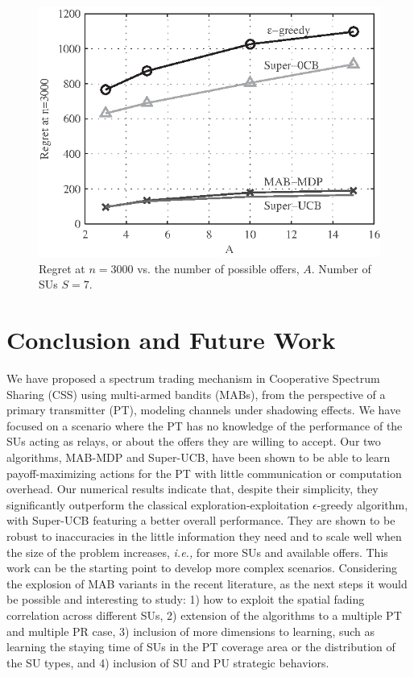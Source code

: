 \begin{figure}[!t]
\centering
\includegraphics{VsA.eps}
\caption{Regret at $n = 3000$ vs. the number of possible offers, $A$. Number of SUs $S = 7$.}
\label{fig:VsA}
\end{figure}

\section{Conclusion and Future Work}\label{sec:Con}
We have proposed a spectrum trading mechanism in Cooperative Spectrum Sharing (CSS) using multi-armed bandits (MABs), from the perspective of a primary transmitter (PT),  modeling channels under shadowing effects. 
We have focused on a scenario where the PT has no knowledge of the performance of the SUs acting as relays, or about the offers they are willing to accept. 
Our two algorithms, MAB-MDP and Super-UCB, have been shown to be able to learn payoff-maximizing actions for the PT with little communication or computation overhead. 
Our numerical results indicate that, despite their simplicity, they significantly outperform the classical exploration-exploitation $\epsilon$-greedy algorithm, with Super-UCB featuring a better overall performance.
They are shown to be robust to inaccuracies in the little information they need and to scale well when the size of the problem increases, \textit{i.e.,} for more SUs and available offers.
This work can be the starting point to develop more complex scenarios.  
Considering the explosion of MAB variants in the recent literature, as the next steps it would be possible and interesting to study: 1) how to exploit the spatial fading correlation across different SUs, 2) extension of the algorithms to a multiple PT and multiple PR case, 3) inclusion of more dimensions to learning, such as learning the staying time of SUs in the PT coverage area or the distribution of the SU types, and 4) inclusion of SU and PU strategic behaviors. 


